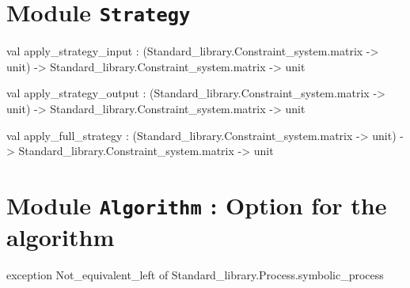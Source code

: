 \section{Module {\tt{Strategy}}}
\label{module:Strategy}


\ocamldocvspace{0.5cm}



\label{val:Strategy.apply-underscorestrategy-underscoreinput}\begin{ocamldoccode}
val apply_strategy_input :
  (Standard_library.Constraint_system.matrix -> unit) ->
  Standard_library.Constraint_system.matrix -> unit
\end{ocamldoccode}




\label{val:Strategy.apply-underscorestrategy-underscoreoutput}\begin{ocamldoccode}
val apply_strategy_output :
  (Standard_library.Constraint_system.matrix -> unit) ->
  Standard_library.Constraint_system.matrix -> unit
\end{ocamldoccode}




\label{val:Strategy.apply-underscorefull-underscorestrategy}\begin{ocamldoccode}
val apply_full_strategy :
  (Standard_library.Constraint_system.matrix -> unit) ->
  Standard_library.Constraint_system.matrix -> unit
\end{ocamldoccode}


\section{Module {\tt{Algorithm}} : Option for the algorithm}
\label{module:Algorithm}




\ocamldocvspace{0.5cm}



\label{exception:Algorithm.Not-underscoreequivalent-underscoreleft}\begin{ocamldoccode}
exception Not_equivalent_left of Standard_library.Process.symbolic_process
\end{ocamldoccode}




